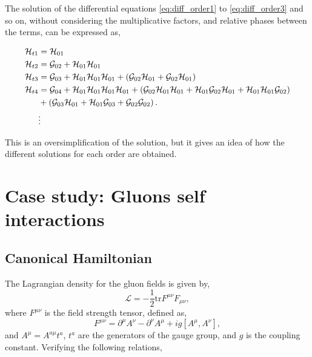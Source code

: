 \documentclass[11pt,a4paper,twoside,pdf]{article}
\numberwithin{equation}{section}
\begin{document}
The solution of the differential equations \eqref{eq:diff_order1} to \eqref{eq:diff_order3} 
and so on, without considering the multiplicative factors, and relative phases between
the terms, can be expressed as,

\begin{align}
    \mathcal{H}_{t1} & = \mathcal{H}_{01} \\
    \mathcal{H}_{t2} & = \mathcal{G}_{02} + \mathcal{H}_{01} 
    \mathcal{H}_{01}\\
    \mathcal{H}_{t3} & = \mathcal{G}_{03} + \mathcal{H}_{01} \mathcal{H}_{01}
    \mathcal{H}_{01} + \left( \mathcal{G}_{02} \mathcal{H}_{01} + \mathcal{G}_{02}
    \mathcal{H}_{01}  \right)\\
    \mathcal{H}_{t4} & = \mathcal{G}_{04} + \mathcal{H}_{01} \mathcal{H}_{01}
    \mathcal{H}_{01} \mathcal{H}_{01} + \left( \mathcal{G}_{02} 
    \mathcal{H}_{01} \mathcal{H}_{01} +  \mathcal{H}_{01} \mathcal{G}_{02}
    \mathcal{H}_{01} + \mathcal{H}_{01} \mathcal{H}_{01} \mathcal{G}_{02} \right) \nonumber\\
    & + \left( \mathcal{G}_{03} \mathcal{H}_{01} + \mathcal{H}_{01} 
    \mathcal{G}_{03} + \mathcal{G}_{02}\mathcal{G}_{02} \right). \\
    &\vdots  \nonumber
\end{align}

This is an oversimplification of the solution, but it gives an idea of how the 
different solutions for each order are obtained. 

\section{Case study: Gluons self interactions} \label{sec:cases}

\subsection{Canonical Hamiltonian}

The Lagrangian density for the gluon fields is given by,
\begin{equation}
    \mathcal{L} = -\frac{1}{2}\text{tr}F^{\mu\nu}F_{\mu\nu},
\end{equation}
where $F^{\mu\nu}$ is the field strength tensor, defined as,
\begin{equation}
    F^{\mu\nu} = \partial^\mu A^\nu - \partial^\nu A^\mu + ig [A^\mu, A^\nu],
\end{equation}
and $A^\mu = A^{a\mu}t^a$, $t^a$ are the generators of the gauge group, and $g$ is the
coupling constant. Verifying the following relations,
\end{document}

